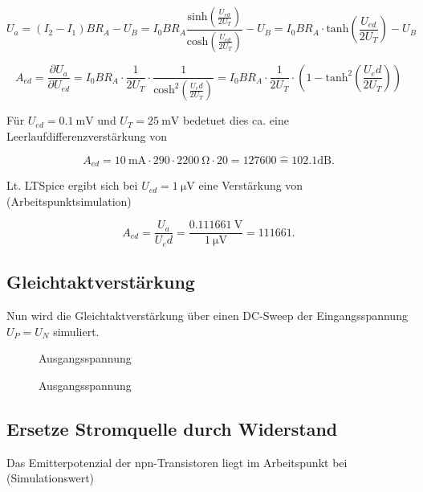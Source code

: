 \begin{equation}
    U_a = ( I_2 - I_1 ) B R_A - U_B = I_0BR_A \frac{\text{sinh}\left( \frac{U_{ed}}{2U_T}  \right)}{\text{cosh}\left( \frac{U_{ed}}{2U_T}  \right)} - U_B = I_0BR_A \cdot \text{tanh}\left( \frac{U_{ed}}{2U_T} \right) - U_B
\end{equation}

\begin{equation}
    A_{ed} = \frac{\partial U_a}{\partial U_{ed}} = I_0BR_A \cdot \frac{1}{2U_T} \cdot \frac{1}{\text{cosh}^2\left( \frac{U_ed}{2U_T}  \right)} = I_0BR_A \cdot \frac{1}{2U_T} \cdot \left( 1 - \text{tanh}^2\left(\frac{U_ed}{2U_T} \right) \right)
\end{equation}

Für $U_{ed} = \SI{0.1}{\milli\volt}$ und $U_T = \SI{25}{\milli\volt}$ bedetuet dies ca. eine Leerlaufdifferenzverstärkung von

\begin{equation}
    A_{ed} = \SI{10}{\milli\ampere} \cdot 290 \cdot \SI{2200}{\ohm} \cdot 20 = 127600 \hat{=} 102.1 \text{dB} .
\end{equation}

Lt. LTSpice ergibt sich bei $U_{ed} = \SI{1}{\micro\volt}$ eine Verstärkung von (Arbeitspunktsimulation)

\begin{equation}
    A_{ed} = \frac{U_a}{U_ed} = \frac{\SI{0.111661}{\volt}}{\SI{1}{\micro\volt}} = 111 661 .
\end{equation}

\subsection{Gleichtaktverstärkung}
Nun wird die Gleichtaktverstärkung über einen DC-Sweep der Eingangsspannung $U_P = U_N$ simuliert.

\begin{figure}[H]
	\centering \small
	\scalebox{0.9}{}
	\caption{Ausgangsspannung}
	\label{fig_Kap5_16:transfer}
\end{figure}

\begin{figure}[H]
	\centering \small
	\scalebox{0.9}{}
	\caption{Ausgangsspannung}
	\label{fig_Kap5_17:transfer}
\end{figure}

\subsection{Ersetze Stromquelle durch Widerstand}
Das Emitterpotenzial der npn-Transistoren liegt im Arbeitspunkt bei (Simulationswert)

